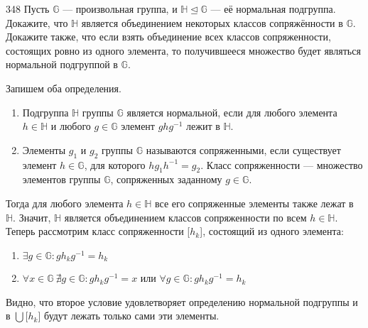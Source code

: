 \begin{task}{348}
	Пусть $\mathbb {G}$ — произвольная группа, и $\mathbb{H \trianglelefteq G}$ — её нормальная подгруппа. Докажите, что $\mathbb{H}$ является объединением некоторых классов сопряжённости в $\mathbb{G}$. Докажите также, что если взять объединение всех классов сопряженности, состоящих ровно из одного элемента, то получившееся множество будет являться нормальной подгруппой в $\mathbb{G}$.
\end{task}

\begin{solution} 
Запишем оба определения.
    \begin{enumerate}
	\item Подгруппа $\mathbb{H}$ группы $\mathbb{G}$ является нормальной, если для любого элемента $h \in \mathbb{H}$ и любого $g \in \mathbb{G}$ элемент $ghg^{-1}$ лежит в $\mathbb{H}$. 
	\item Элементы $g_1$ и $g_2$ группы $\mathbb{G}$ называются сопряженными, если существует элемент $h \in \mathbb{G}$, для которого $hg_1h^{-1}=g_2$. Класс сопряженности --- множество элементов группы $\mathbb{G}$, сопряженных заданному $g \in \mathbb{G}$.
	\end{enumerate}
	Тогда для любого элемента $h \in \mathbb{H}$ все его сопряженные элементы также лежат в $\mathbb{H}$. Значит, $\mathbb{H}$ является объединением классов сопряженности по всем $h \in \mathbb{H}$. Теперь рассмотрим класс сопряженности [$h_k$], состоящий из одного элемента:
	\begin{enumerate}
	    \item $\exists g \in \mathbb{G}:  g h_k g^{-1} = h_k$
	    \item $\forall x \in \mathbb{G} \ \nexists g \in \mathbb{G}: g h_k g^{-1} = x$ или $\forall g \in \mathbb{G}: g h_k g^{-1} = h_k$
	\end{enumerate}
	Видно, что второе условие удовлетворяет определению нормальной подгруппы и в $\bigcup$[$h_k$] будут лежать только сами эти элементы.
\end{solution}